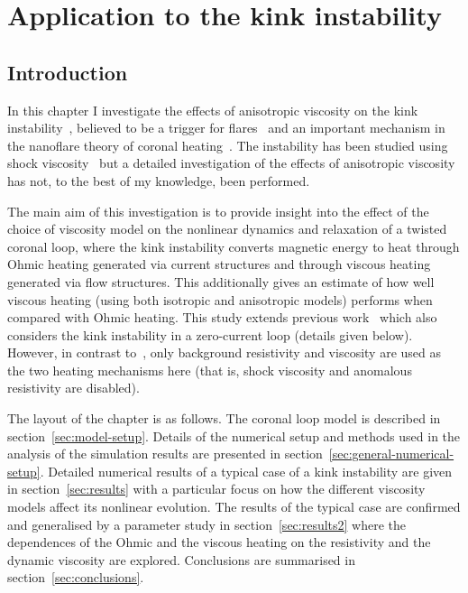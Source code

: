 \chapter{Application to the kink instability}
\label{chp:kink_instability}

\graphicspath{{images/kink_instability/}}

\section{Introduction}
\label{sec:kink_introduction}

In this chapter I investigate the effects of anisotropic viscosity on the kink instability~\cite{hoodKinkInstabilitySolar1979, hoodCoronalHeatingMagnetic2009}, believed to be a trigger for flares~\cite{srivastavaObservationKinkInstability2010} and an important mechanism in the nanoflare theory of coronal heating~\cite{browningHeatingCoronaNanoflares2008a}. The instability has been studied using shock viscosity~\cite{hoodCoronalHeatingMagnetic2009,barefordShockHeatingNumerical2015} but a detailed investigation of the effects of anisotropic viscosity has not, to the best of my knowledge, been performed.

The main aim of this investigation is to provide insight into the effect of the choice of viscosity model on the nonlinear dynamics and relaxation of a twisted coronal loop, where the kink instability converts magnetic energy to heat through Ohmic heating generated via current structures and through viscous heating generated via flow structures. This additionally gives an estimate of how well viscous heating (using both isotropic and anisotropic models) performs when compared with Ohmic heating. This study extends previous work~\cite{hoodCoronalHeatingMagnetic2009} which also considers the kink instability in a zero-current loop (details given below). However, in contrast to~\cite{hoodCoronalHeatingMagnetic2009}, only background resistivity and viscosity are used as the two heating mechanisms here (that is, shock viscosity and anomalous resistivity are disabled).

The layout of the chapter is as follows. The coronal loop model is described in section~\ref{sec:model-setup}. Details of the numerical setup and methods used in the analysis of the simulation results are presented in section~\ref{sec:general-numerical-setup}. Detailed numerical results of a typical case of a kink instability are given in section~\ref{sec:results} with a particular focus on how the different viscosity models affect its nonlinear evolution. The results of the typical case are confirmed and generalised by a parameter study in section~\ref{sec:results2} where the dependences of the Ohmic and the viscous heating on the resistivity and the dynamic viscosity are explored. Conclusions are summarised in section~\ref{sec:conclusions}.

